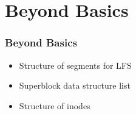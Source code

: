 \section{Beyond Basics}

\begin{frame}
\frametitle{Beyond Basics}
\begin{itemize}[<+->]
	\setlength\itemsep{1em}
	\item Structure of segments for LFS
	\item Superblock data structure list
	\item Structure of inodes
\end{itemize}
\end{frame}
